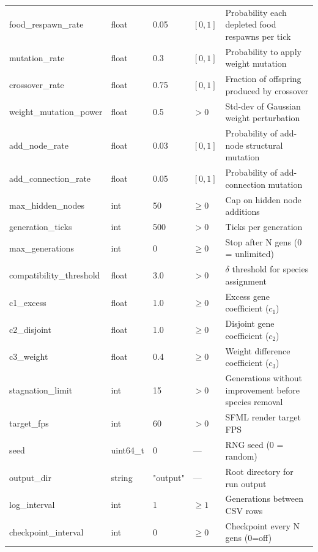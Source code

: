 \begin{longtable}[l]{@{}>{\ttfamily\small}p{5.8cm}>{\ttfamily\small\RaggedRight}p{2.2cm}p{0.7cm}p{1.0cm}p{3.3cm}@{}}
food\_respawn\_rate    & float  & 0.05   & $[0,1]$       & Probability each depleted food respawns per tick \\
mutation\_rate         & float  & 0.3    & $[0,1]$       & Probability to apply weight mutation \\
crossover\_rate        & float  & 0.75   & $[0,1]$       & Fraction of offspring produced by crossover \\
weight\_mutation\_power& float  & 0.5    & $>0$          & Std-dev of Gaussian weight perturbation \\
add\_node\_rate        & float  & 0.03   & $[0,1]$       & Probability of add-node structural mutation \\
add\_connection\_rate  & float  & 0.05   & $[0,1]$       & Probability of add-connection mutation \\
max\_hidden\_nodes     & int    & 50     & $\ge 0$       & Cap on hidden node additions \\
generation\_ticks      & int    & 500    & $>0$          & Ticks per generation \\
max\_generations       & int    & 0      & $\ge 0$       & Stop after N gens (0 = unlimited) \\
compatibility\_threshold& float & 3.0   & $>0$          & $\delta$ threshold for species assignment \\
c1\_excess             & float  & 1.0    & $\ge 0$       & Excess gene coefficient ($c_1$) \\
c2\_disjoint           & float  & 1.0    & $\ge 0$       & Disjoint gene coefficient ($c_2$) \\
c3\_weight             & float  & 0.4    & $\ge 0$       & Weight difference coefficient ($c_3$) \\
stagnation\_limit      & int    & 15     & $>0$          & Generations without improvement before species removal \\
target\_fps            & int    & 60     & $>0$          & SFML render target FPS \\
seed                   & uint64\_t & 0   & —             & RNG seed (0 = random) \\
output\_dir            & string & "output" & — & Root directory for run output \\
log\_interval          & int    & 1      & $\ge 1$       & Generations between CSV rows \\
checkpoint\_interval   & int    & 0      & $\ge 0$       & Checkpoint every N gens (0=off) \\

\end{longtable}
